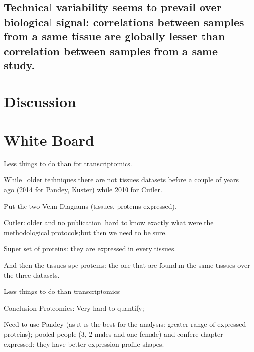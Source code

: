\subsection{Technical variability seems to prevail over biological signal:
correlations between samples from a same tissue are globally lesser than
correlation between samples from a same study.}


\section{Discussion}





\section{White Board}

Less things to do than for transcriptomics.

While \ms\ older techniques there are not tissues datasets before a couple of
years ago (2014 for Pandey, Kuster) while 2010 for Cutler.


Put the two Venn Diagrams (tissues, proteins expressed).

Cutler: older and no publication,
hard to know exactly what were the methodological protocols;but then we need to
be sure.

Super set of proteins: they are expressed in every tissues.

And then the tissues spe proteins: the one that are found in the same tissues
over the three datasets.


Less things to do than transcriptomics

Conclusion Proteomics: Very hard to quantify;

Need to use Pandey (as it is the best for the analysis:
greater range of expressed proteins); pooled people (3, 2 males and one female)
and confere chapter expressed: they have better expression profile shapes.




